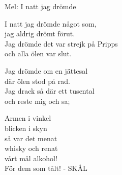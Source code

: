 \begin{SongText}
    \begin{SongInfo}
        Mel: I natt jag drömde
    \end{SongInfo}
    \begin{SongVerse}
        I natt jag drömde något som,\\%
        jag aldrig drömt förut.\\%
        Jag drömde det var strejk på Pripps\\%
        och alla ölen var slut.
    \end{SongVerse}
    \begin{SongVerse}
        Jag drömde om en jättesal\\%
        där ölen stod på rad.\\%
        Jag drack så där ett tusental\\%
        och reste mig och sa;
    \end{SongVerse}
    \begin{SongVerse}
        Armen i vinkel\\%
        blicken i skyn\\%
        så var det menat\\%
        whisky och renat\\%
        vårt mål alkohol!\\%
        För dem som tålt! - SKÅL
    \end{SongVerse}
\end{SongText}
